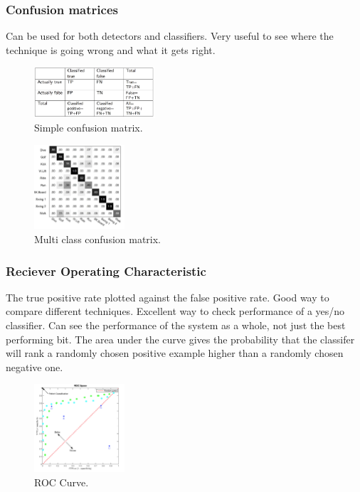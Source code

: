 \documentclass[8pt]{extarticle}
\begin{document}
\begin{multicols}{2}
\subsubsection{Confusion matrices}
Can be used for both detectors and classifiers. Very useful to see where the technique is going wrong and what it gets right.

\begin{figure}[H]
    \centering
    \includegraphics[width=0.4\textwidth]{confusion_matrix.png}
    \caption{Simple confusion matrix.}
    \label{fig:confusion-matrix}
\end{figure}

\begin{figure}[H]
    \centering
    \includegraphics[width=0.3\textwidth]{confusion_matrix_2.png}
    \caption{Multi class confusion matrix.}
    \label{fig:confusion-matrix-2}
\end{figure}

\subsubsection{Reciever Operating Characteristic}
The true positive rate plotted against the false positive rate. Good way to compare different techniques. Excellent way to check performance of a yes/no classifier. Can see the performance of the system as a whole, not just the best performing bit. The area under the curve gives the probability that the classifer will rank a randomly chosen positive example higher than a randomly chosen negative one.

\begin{figure}[H]
    \centering
    \includegraphics[width=0.3\textwidth]{roc_curve.png}
    \caption{ROC Curve.}
    \label{fig:roc-curve}
\end{figure}


\end{multicols}
\end{document}
